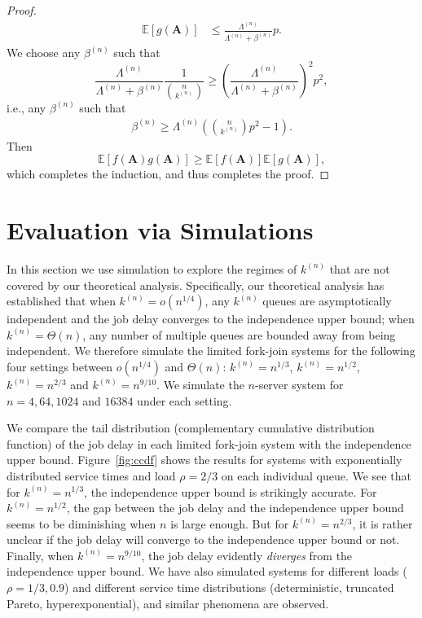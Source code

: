 \documentclass[sigconf]{acmart}
\newcommand{\expect}{\mathbb{E}} %
\newcommand{\supn}{^{(n)}}
\begin{document}
\begin{proof}
\begin{align*}
\expect[g(\bm{A})]
&\le\frac{\Lambda\supn}{\Lambda\supn+\beta\supn}p.
\end{align*}
We choose any $\beta\supn$ such that
\begin{equation*}
\frac{\Lambda\supn}{\Lambda\supn+\beta\supn} \frac{1}{\binom{n}{k\supn}}\ge \left(\frac{\Lambda\supn}{\Lambda\supn+\beta\supn}\right)^2p^2,
\end{equation*}
i.e., any $\beta\supn$ such that
\begin{align}
\beta\supn\ge\Lambda\supn\left(\binom{n}{k\supn}p^2-1\right).\label{eq:beta}
\end{align}
Then
\begin{equation*}
\expect[f(\bm{A})g(\bm{A})]\ge \expect[f(\bm{A})]\expect[g(\bm{A})],
\end{equation*}
which completes the induction, and thus completes the proof.
\end{proof}




\section{Evaluation via Simulations}\label{sec:simulations}
In this section we use simulation to explore the regimes of $k\supn$ that are not covered by our theoretical analysis.  Specifically, our theoretical analysis has established that when $k\supn=o(n^{1/4})$, any $k\supn$ queues are asymptotically independent and the job delay converges to the independence upper bound; when $k\supn=\Theta(n)$, any number of multiple queues are bounded away from being independent.  We therefore simulate the limited fork-join systems for the following four settings between $o(n^{1/4})$ and $\Theta(n)$: $k\supn=n^{1/3}$, $k\supn=n^{1/2}$, $k\supn=n^{2/3}$ and $k\supn=n^{9/10}$.  We simulate the $n$-server system for $n=4, 64, 1024$ and $16384$ under each setting.


We compare the tail distribution (complementary cumulative distribution function) of the job delay in each limited fork-join system with the independence upper bound. Figure~\ref{fig:ccdf} shows the results for systems with exponentially distributed service times and load $\rho=2/3$ on each individual queue.  We see that for $k\supn=n^{1/3}$, the independence upper bound is strikingly accurate.  For $k\supn=n^{1/2}$, the gap between the job delay and the independence upper bound seems to be diminishing when $n$ is large enough.  But for $k\supn=n^{2/3}$, it is rather unclear if the job delay will converge to the independence upper bound or not.  Finally, when $k\supn=n^{9/10}$, the job delay evidently \emph{diverges} from the independence upper bound.  We have also simulated systems for different loads ($\rho = 1/3, 0.9$) and different service time distributions (deterministic, truncated Pareto, hyperexponential), and similar phenomena are observed.
\end{document}
